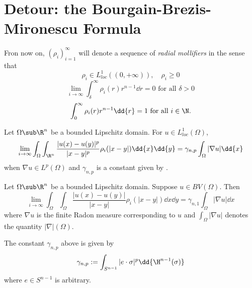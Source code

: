 \documentclass[../main.tex]{subfiles}
\begin{document}
\section{Detour: the Bourgain-Brezis-Mironescu Formula}

\begin{definition}
Fron now on, $ (\rho_{i})_{i=1}^{\infty} $ will denote a sequence of \textit{radial mollifiers} in the sense that 
\begin{equation}
    \rho_{i}\in L^{1}_{loc}((0,+\infty)),\quad \rho_{i}\geq 0
\end{equation}
\begin{equation}
    \lim_{i\to\infty}\int_{\delta}^{\infty} \rho_{i}(r)r^{n-1}\dd{r} = 0 \text{ for all } \delta>0 
\end{equation}
\begin{equation}
    \int_{0}^{\infty}\rho_{i}(r)r^{n-1}\dd{r} = 1 \text{ for all } i\in \N.
\end{equation}


\end{definition}

\begin{theorem}
    Let $ \Omega\sub \R^{n} $ be a bounded Lipschitz domain. For $ u\in L^{1}_{loc}(\Omega) $,
    \[
        \lim_{i\to\infty} \int_{\Omega}\int_{\R^{n}} \frac{|u(x)-u(y)|^{p}}{|x-y|^{p}} \rho_{i}(|x-y|)\dd{x} \dd{y} = \gamma_{n,p}\int_{\Omega}| \nabla{u}| \dd{x}
    \]
    when $ \nabla{u}\in L^{p}(\Omega) $ and $ \gamma_{n,p} $ is a constant given by . 
\end{theorem}

\begin{theorem}\label{bbmd}
    Let $ \Omega\sub \R^{n} $ be a bounded Lipschitz domain. Suppose $ u\in BV(\Omega) $. Then
    \[
        \lim_{i\to\infty} \int_{\Omega}\int_{\Omega} \frac{|u(x)-u(y)|}{|x-y|} \rho_{i}(|x-y|)\dd{x} \dd{y} = \gamma_{n,1}\int_{\Omega}| \nabla{u}| \dd{x}
    \]
    where $ \nabla u $ is the finite Radon measure corresponding to $ u $ and $ \int_{\Omega} |\nabla u| $ denotes the quantity $ |\nabla |(\Omega) $.
\end{theorem}

The constant $ \gamma_{n,p} $ above is given by 
\[
    \gamma_{n,p}:= \int_{S^{n-1}} |e\cdot \sigma|^p \dd{\H^{n-1}(\sigma)}
\]
where $ e\in S^{n-1} $ is arbitrary.\\
\end{document}
